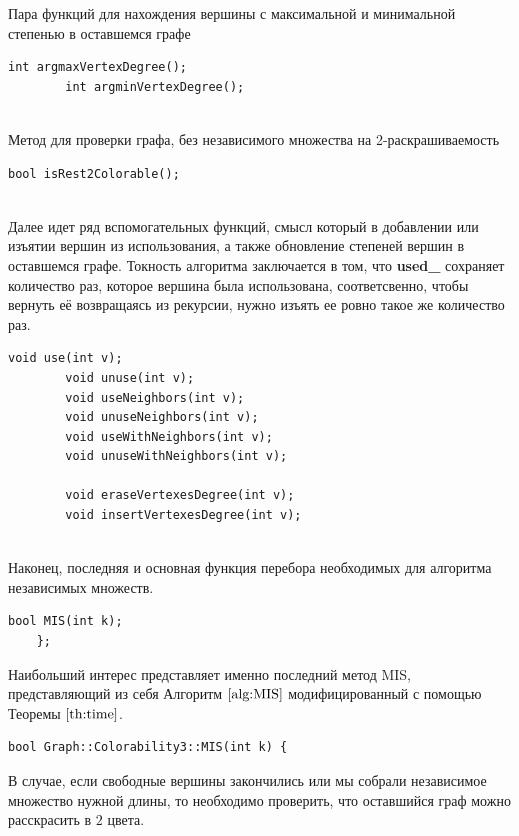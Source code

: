 \documentclass[12pt]{article}
\begin{document}
Пара функций для нахождения вершины с максимальной и минимальной сте\-пенью в оставшемся графе

\begin{lstlisting}[mathescape=true]
        int argmaxVertexDegree();
        int argminVertexDegree();
    
\end{lstlisting}

Метод для проверки графа, без независимого множества на 2-раскрашиваемость

\begin{lstlisting}[mathescape=true]
        bool isRest2Colorable();
    
\end{lstlisting}

Далее идет ряд вспомогательных функций, смысл который в добавлении или изъ\-я\-тии вершин из использования, а также обновление степеней вершин в оставшемся графе. Токность алгоритма заключается в том, что \textbf{used\_} сохраняет количество раз, которое вершина была использована, соответсвенно, чтобы вернуть её возвращаясь из рекурсии, нужно изъять ее ровно такое же количество раз.

\begin{lstlisting}[mathescape=true]
        void use(int v);
        void unuse(int v);
        void useNeighbors(int v);
        void unuseNeighbors(int v);
        void useWithNeighbors(int v);
        void unuseWithNeighbors(int v);
        
        void eraseVertexesDegree(int v);
        void insertVertexesDegree(int v);
    
\end{lstlisting}

Наконец, последняя и основная функция перебора необходимых для алгоритма не\-за\-ви\-си\-мых множеств.

\begin{lstlisting}[mathescape=true]
        bool MIS(int k);
    };
\end{lstlisting}

Наибольший интерес представляет именно последний метод MIS, представляющий из себя Алгоритм $\ref{alg:MIS}$ модифицированный с помощью Теоремы $\eqref{th:time}$.

\begin{lstlisting}[mathescape=true]
    bool Graph::Colorability3::MIS(int k) {
\end{lstlisting}

В случае, если свободные вершины закончились или мы собрали независимое мно\-же\-ство нужной длины, то необходимо проверить, что оставшийся граф можно расскрасить в $2$ цвета.
\end{document}
